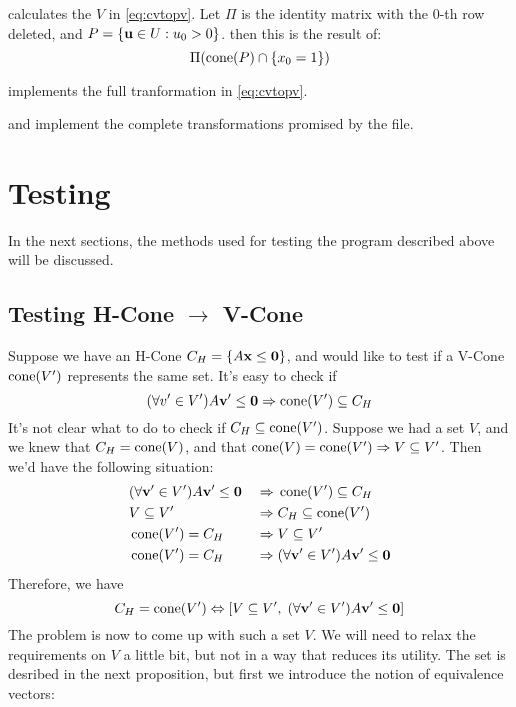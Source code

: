  calculates the $V$ in \eqref{eq:cvtopv}.  Let $\Pi$ is the identity matrix with the $0$-th row deleted, and $P = \left\{\mathbf{u} \in U : u_0 > 0\right\}$. then this is the result of:
\[ \Pi(\operatorname{cone}(P) \cap \left\{x_0 = 1\right\}) \]
\lstnormalizedP

 implements the full tranformation in \eqref{eq:cvtopv}.
\lstvconetovpoly

 and  implement the complete transformations promised by the file.
\lsthpolytovpoly
\lstvpolytohpoly

\section{Testing}

In the next sections, the methods used for testing the program described above will be discussed.

\subsection{Testing H-Cone $\to$ V-Cone}
Suppose we have an H-Cone $C_H = \left\{A\mathbf{x}\leq\mathbf{0}\right\}$, and would like to test if a V-Cone $\operatorname{cone}(V')$ represents the same set.  It's easy to check if
\[ (\forall v' \in V') A\mathbf{v}'\leq\mathbf{0} \Rightarrow \operatorname{cone}(V') \subseteq C_H \]
It's not clear what to do to check if $C_H \subseteq \operatorname{cone}(V')$.  Suppose we had a set $V$, and we knew that $C_H = \operatorname{cone}(V)$, and that $\operatorname{cone}(V) = \operatorname{cone}(V') \Rightarrow V \subseteq V'$.  Then we'd have the following situation:
\begin{alignat*}{2}
	 & (\forall \mathbf{v}'\in V') A\mathbf{v}'\leq\mathbf{0} \; & \Rightarrow & \; \operatorname{cone}(V') \subseteq C_H        \\
	 & V \subseteq V'                 \; & \Rightarrow & \; C_H \subseteq \operatorname{cone}(V')        \\
	 & \operatorname{cone}(V') = C_H                \; & \Rightarrow & \; V \subseteq V'                 \\
	 & \operatorname{cone}(V') = C_H                \; & \Rightarrow & \; (\forall \mathbf{v}'\in V') A\mathbf{v}'\leq\mathbf{0}
\end{alignat*}
Therefore, we have
\[ C_H = \operatorname{cone}(V') \Leftrightarrow \left[ V \subseteq V',\;(\forall \mathbf{v}'\in V') A\mathbf{v}'\leq\mathbf{0} \right] \]  The problem is now to come up with such a set $V$.  We will need to relax the requirements on $V$ a little bit, but not in a way that reduces its utility.  The set is desribed in the next proposition, but first we introduce the notion of equivalence vectors:

